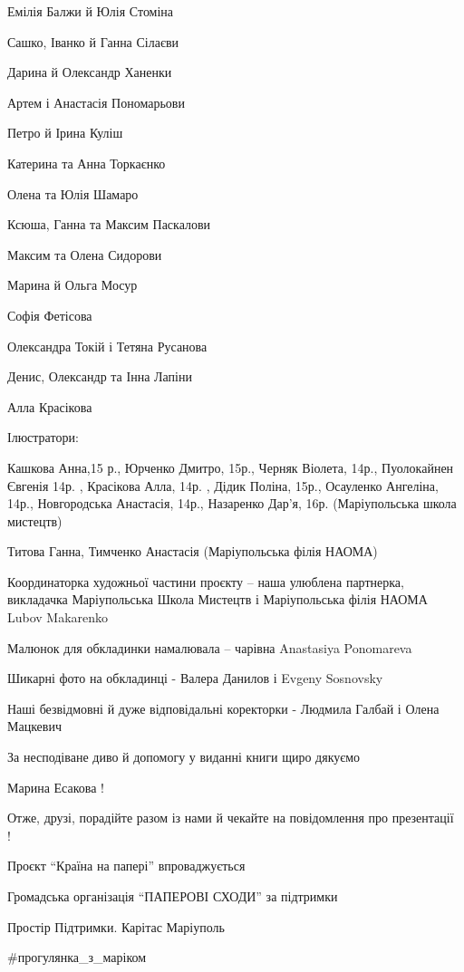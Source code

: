 Емілія Балжи й Юлія Стоміна

Сашко, Іванко й Ганна Сілаєви

Дарина й Олександр Ханенки

Артем і Анастасія Пономарьови

Петро й Ірина Куліш

Катерина та Анна Торкаєнко

Олена та Юлія Шамаро

Ксюша, Ганна та Максим Паскалови

Максим та Олена Сидорови

Марина й Ольга Мосур

Софія Фетісова

Олександра Токій і Тетяна Русанова

Денис, Олександр та Інна Лапіни

Алла Красікова 

Ілюстратори: 

Кашкова Анна,15 р., Юрченко Дмитро, 15р., Черняк Віолета, 14р.,  Пуолокайнен
Євгенія 14р. , Красікова Алла, 14р. , Дідик Поліна, 15р., Осауленко Ангеліна,
14р., Новгородська Анастасія, 14р., Назаренко Дар’я, 16р.  (Маріупольська школа
мистецтв)                                                       

Титова Ганна, Тимченко Анастасія  (Маріупольська філія НАОМА) 

Координаторка художньої частини проєкту – наша улюблена партнерка, викладачка
Маріупольська Школа Мистецтв   і Маріупольська філія НАОМА    Lubov Makarenko

Малюнок для обкладинки намалювала – чарівна Anastasiya Ponomareva

Шикарні фото на обкладинці - Валера Данилов і Evgeny  Sosnovsky 

Наші безвідмовні й дуже відповідальні коректорки - Людмила Галбай і Олена
Мацкевич

За несподіване диво й допомогу у виданні книги щиро дякуємо 

Марина Есакова !

Отже, друзі, порадійте разом із нами й чекайте на повідомлення про презентації 🙂 !

Проєкт \enquote{Країна на папері} впроваджується 

Громадська організація \enquote{ПАПЕРОВІ СХОДИ} за підтримки 

Простір Підтримки. Карітас Маріуполь 

\#прогулянка\_з\_маріком

